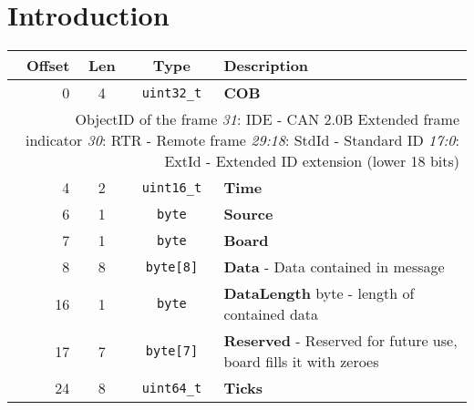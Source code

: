 \section{Introduction}

\begin{tabularx}{\textwidth}{|r|c|c|X|}
\hline
{\bf Offset} & {\bf Len} & {\bf Type} & {\bf Description}\\
\hline
0 & 4 & {\tt uint32\_t} & {\bf COB}  \\\multicolumn{4}{|p{0.8\textwidth}|}{ 
ObjectID of the frame \newline
{\it 31}: IDE - CAN 2.0B Extended frame indicator\newline
{\it 30}: RTR - Remote frame\newline
{\it 29:18}: StdId - Standard ID\newline
{\it 17:0}: ExtId - Extended ID extension (lower 18 bits)}\\\hline
4 & 2 & {\tt uint16\_t} & {\bf Time}\\
6 & 1 & {\tt byte} & {\bf Source}\\
7 & 1 & {\tt byte} & {\bf Board}\\
8 & 8 & {\tt byte[8]} & {\bf Data} - Data contained in message \\
16 & 1 & {\tt byte} & {\bf DataLength} byte    - length of contained data \\
17 & 7 & {\tt byte[7]} & {\bf Reserved} - Reserved for future use, board fills it with zeroes \\
24 & 8 & {\tt uint64\_t} & {\bf Ticks}\\
\hline
\end{tabularx}



